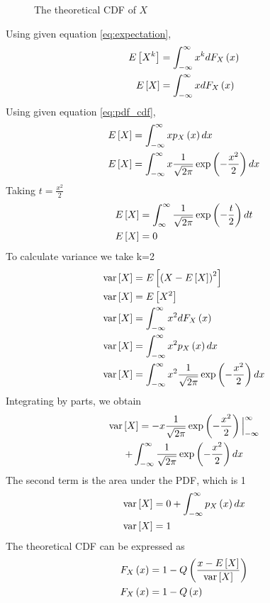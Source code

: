\documentclass[journal,12pt,twocolumn]{IEEEtran}
\renewcommand\thesection{\arabic{section}}
\begin{document}
\begin{enumerate}[label=\thesection.\arabic*
,ref=\thesection.\theenumi]
\begin{figure}[ht!]
    \caption{The theoretical CDF of $X$}
    \label{fig:theory_gauss_cdf}
\end{figure}
Using given equation \eqref{eq:expectation},
\begin{align}
    E\left[ X^k \right] &= \int_{-\infty}^{\infty}x^kdF_{X}\left(x\right) \\
    E\left[ X \right] &= \int_{-\infty}^{\infty}x dF_{X}\left(x\right) 
\end{align}
Using given equation \eqref{eq:pdf_cdf},
\begin{align}
    E\left[ X \right] &= \int_{-\infty}^{\infty}x p_{X}\left(x\right) dx \\
    E\left[ X \right] &= \int_{-\infty}^{\infty}x
    \frac{1}{\sqrt{2\pi}}\exp\left(-\frac{x^2}{2}\right) dx    
\end{align}
Taking $t = \frac{x^2}{2}$
\begin{align}
     E\left[ X \right] &= \int_{\infty}^{\infty}
    \frac{1}{\sqrt{2\pi}}\exp\left(-\frac{t}{2}\right) dt \\
     E\left[ X \right] &= 0
\end{align}
To calculate variance we take k=2
\begin{align}
    \text{var}\left[ X \right] &= E\left[ \left(X- E\left[ X \right]\right)^2 \right] \\
    \text{var}\left[ X \right] &= E\left[ X^2 \right] \\
    \text{var}\left[ X \right] &= \int_{-\infty}^{\infty}x^2dF_{X}\left(x\right) \\
    \text{var}\left[ X \right] &= \int_{-\infty}^{\infty}x^2 p_{X}\left(x\right) dx \\
    \text{var}\left[ X \right] &= \int_{-\infty}^{\infty}x^2
    \frac{1}{\sqrt{2\pi}}\exp\left(-\frac{x^2}{2}\right) dx   
\end{align}
Integrating by parts, we obtain
\begin{multline}
    \text{var}\left[ X \right] = -x\frac{1}{\sqrt{2\pi}}\exp\left(-\frac{x^2}{2}\right)  \Big|_{-\infty}^{\infty}  \\
    + \int_{-\infty}^{\infty}
    \frac{1}{\sqrt{2\pi}}\exp\left(-\frac{x^2}{2}\right) dx   
\end{multline}
The second term is the area under the PDF, which is 1
\begin{align}
    \text{var}\left[ X \right] &= 0 + \int_{-\infty}^{\infty}p_{X}\left(x\right)dx \\
    \text{var}\left[ X \right] &= 1   
\end{align}
The theoretical CDF can be expressed as
\begin{align}
	F_X\left(x\right) &= 1 - Q\left(\frac {x-E\left[ X \right]} {\text{var}\left[ X \right]} \right) \\
	F_X\left(x\right) &= 1 - Q\left(x\right)
\end{align}
%
\end{enumerate}
\end{document}
